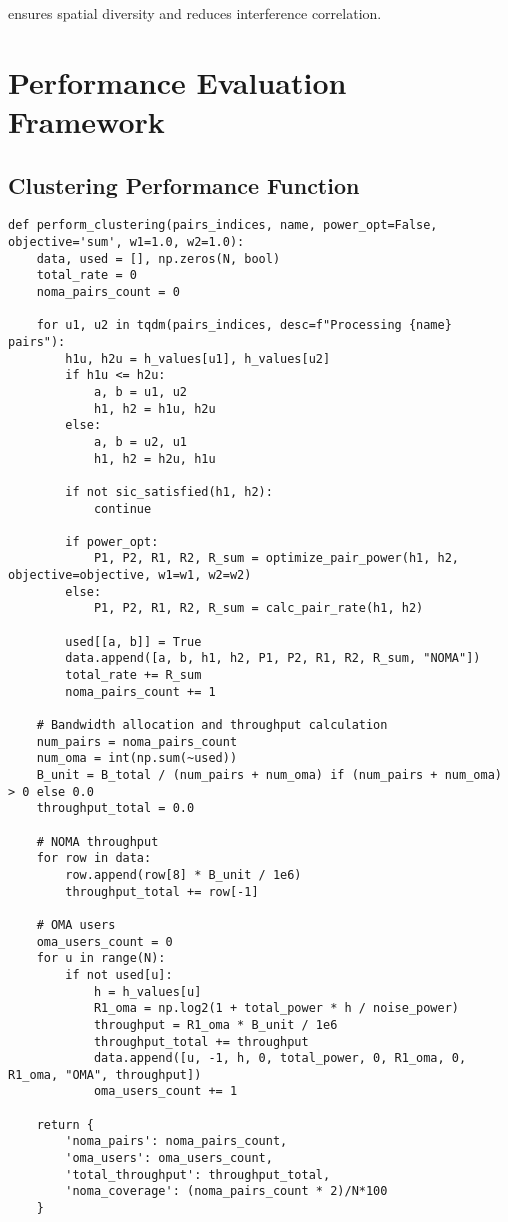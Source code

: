 \documentclass[11pt,a4paper]{article}
\begin{document}
ensures spatial diversity and reduces interference correlation.

\section{Performance Evaluation Framework}

\subsection{Clustering Performance Function}

\begin{lstlisting}[caption={Performance Evaluation Implementation}]
def perform_clustering(pairs_indices, name, power_opt=False, objective='sum', w1=1.0, w2=1.0):
    data, used = [], np.zeros(N, bool)
    total_rate = 0
    noma_pairs_count = 0

    for u1, u2 in tqdm(pairs_indices, desc=f"Processing {name} pairs"):
        h1u, h2u = h_values[u1], h_values[u2]
        if h1u <= h2u:
            a, b = u1, u2
            h1, h2 = h1u, h2u
        else:
            a, b = u2, u1
            h1, h2 = h2u, h1u

        if not sic_satisfied(h1, h2):
            continue

        if power_opt:
            P1, P2, R1, R2, R_sum = optimize_pair_power(h1, h2, objective=objective, w1=w1, w2=w2)
        else:
            P1, P2, R1, R2, R_sum = calc_pair_rate(h1, h2)

        used[[a, b]] = True
        data.append([a, b, h1, h2, P1, P2, R1, R2, R_sum, "NOMA"])
        total_rate += R_sum
        noma_pairs_count += 1

    # Bandwidth allocation and throughput calculation
    num_pairs = noma_pairs_count
    num_oma = int(np.sum(~used))
    B_unit = B_total / (num_pairs + num_oma) if (num_pairs + num_oma) > 0 else 0.0
    throughput_total = 0.0

    # NOMA throughput
    for row in data:
        row.append(row[8] * B_unit / 1e6)
        throughput_total += row[-1]

    # OMA users
    oma_users_count = 0
    for u in range(N):
        if not used[u]:
            h = h_values[u]
            R1_oma = np.log2(1 + total_power * h / noise_power)
            throughput = R1_oma * B_unit / 1e6
            throughput_total += throughput
            data.append([u, -1, h, 0, total_power, 0, R1_oma, 0, R1_oma, "OMA", throughput])
            oma_users_count += 1

    return {
        'noma_pairs': noma_pairs_count,
        'oma_users': oma_users_count,
        'total_throughput': throughput_total,
        'noma_coverage': (noma_pairs_count * 2)/N*100
    }
\end{lstlisting}
\end{document}
